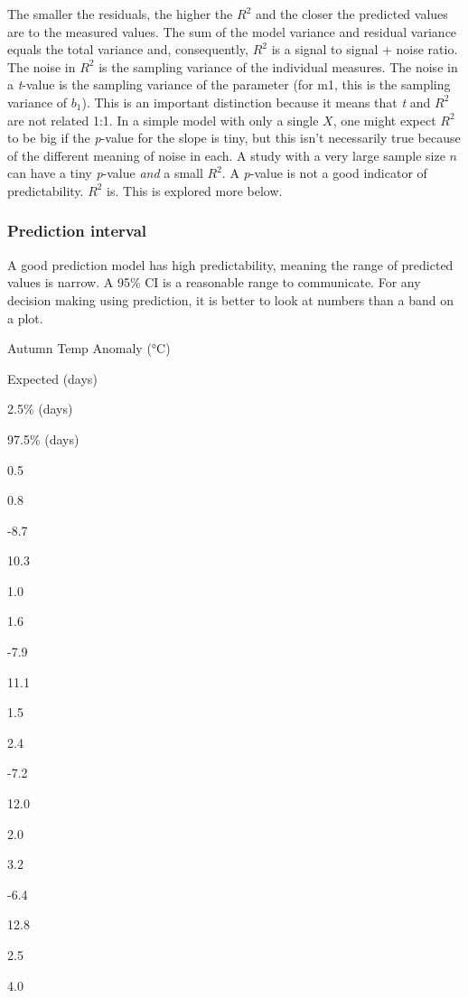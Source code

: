 \documentclass[]{book}
\begin{document}
The smaller the residuals, the higher the \(R^2\) and the closer the predicted values are to the measured values. The sum of the model variance and residual variance equals the total variance and, consequently, \(R^2\) is a signal to signal + noise ratio. The noise in \(R^2\) is the sampling variance of the individual measures. The noise in a \emph{t}-value is the sampling variance of the parameter (for m1, this is the sampling variance of \(b_1\)). This is an important distinction because it means that \emph{t} and \(R^2\) are not related 1:1. In a simple model with only a single \(X\), one might expect \(R^2\) to be big if the \emph{p}-value for the slope is tiny, but this isn't necessarily true because of the different meaning of noise in each. A study with a very large sample size \(n\) can have a tiny \emph{p}-value \emph{and} a small \(R^2\). A \emph{p}-value is not a good indicator of predictability. \(R^2\) is. This is explored more below.

\hypertarget{prediction-interval}{%
\subsubsection{Prediction interval}\label{prediction-interval}}

A good prediction model has high predictability, meaning the range of predicted values is narrow. A 95\% CI is a reasonable range to communicate. For any decision making using prediction, it is better to look at numbers than a band on a plot.

Autumn Temp Anomaly (°C)

Expected (days)

2.5\% (days)

97.5\% (days)

0.5

0.8

-8.7

10.3

1.0

1.6

-7.9

11.1

1.5

2.4

-7.2

12.0

2.0

3.2

-6.4

12.8

2.5

4.0
\end{document}
